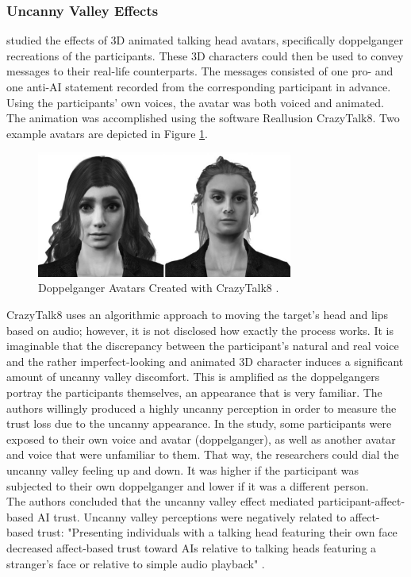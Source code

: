\documentclass[
  a4paper,  %
  twoside,  %
  bibliography=totoc,
  headsepline,
  cleardoublepage=empty,
  parskip=half,
  draft=false
]{scrbook}
\begin{document}
\subsubsection*{Uncanny Valley Effects}
 studied the effects of 3D animated talking head avatars, specifically doppelganger recreations of the participants. These 3D characters could then be used to convey messages to their real-life counterparts. The messages consisted of one pro- and one anti-AI statement recorded from the corresponding participant in advance. Using the participants' own voices, the avatar was both voiced and animated. The animation was accomplished using the software Reallusion CrazyTalk8. Two example avatars are depicted in Figure \ref{fig:uncanny-avatars}.

\begin{figure}[h]
  \centering
  \includegraphics[width=0.75\textwidth]{./graphics/uncanny-avatars.png}
  \caption{Doppelganger Avatars Created with CrazyTalk8 \cite{weismanFaceUncannyEffects2021}.}
  \label{fig:uncanny-avatars}
\end{figure}

CrazyTalk8 uses an algorithmic approach to moving the target's head and lips based on audio; however, it is not disclosed how exactly the process works. It is imaginable that the discrepancy between the participant's natural and real voice and the rather imperfect-looking and animated 3D character induces a significant amount of uncanny valley discomfort. This is amplified as the doppelgangers portray the participants themselves, an appearance that is very familiar. The authors willingly produced a highly uncanny perception in order to measure the trust loss due to the uncanny appearance. In the study, some participants were exposed to their own voice and avatar (doppelganger), as well as another avatar and voice that were unfamiliar to them. That way, the researchers could dial the uncanny valley feeling up and down. It was higher if the participant was subjected to their own doppelganger and lower if it was a different person.\\
The authors concluded that the uncanny valley effect mediated participant-affect-based AI trust. Uncanny valley perceptions were negatively related to affect-based trust: "Presenting individuals with a talking head featuring their own face decreased affect-based trust toward AIs relative to talking heads featuring a stranger's face or relative to simple audio playback" \cite[p. 185]{weismanFaceUncannyEffects2021}.
\end{document}
